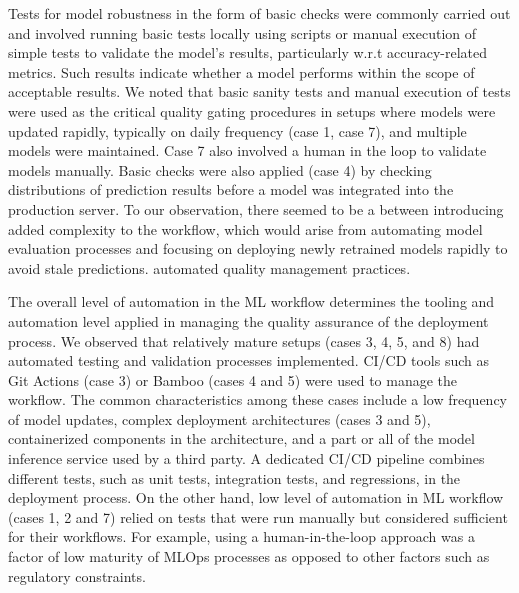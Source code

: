 Tests for model robustness in the form of basic checks were commonly carried out and involved running basic tests locally using scripts or manual execution of simple tests to validate the model's results, particularly w.r.t accuracy-related metrics. Such results indicate whether a model performs within the scope of acceptable results. We noted that basic sanity tests and manual execution of tests were used as the critical quality gating procedures in setups where models were updated rapidly, typically on daily frequency (case 1, case 7), and multiple models were maintained. Case 7 also involved a human in the loop to validate models manually. Basic checks were also applied (case 4) by checking distributions of prediction results before a model was integrated into the production server. To our observation, there seemed to be a \DIFdelbegin {}\DIFdelend \DIFaddbegin {}\DIFaddend between introducing added complexity to the workflow, which would arise from automating model evaluation processes and focusing on deploying newly retrained models rapidly to avoid stale predictions. \DIFdelbegin {}\DIFdelend \DIFaddbegin {}\DIFaddend automated quality management practices\DIFdelbegin {}\DIFdelend \DIFaddbegin {}\DIFaddend . %

The overall level of automation in the ML workflow determines the tooling and automation level applied in managing the quality assurance of the deployment process. We observed that relatively mature setups (cases 3, 4, 5, and 8) had automated testing and validation processes implemented. CI/CD tools such as Git Actions (case 3) or Bamboo (cases 4 and 5) were used to manage the workflow. The common characteristics among these cases include a low frequency of model updates, complex deployment architectures (cases 3 and 5), containerized components in the architecture, and a part or all of the model inference service used by a third party. A dedicated CI/CD pipeline combines different tests, such as unit tests, integration tests, and regressions, in the deployment process. On the other hand, low level of automation in ML workflow %
(cases 1, 2 and 7) relied on tests that were run manually but considered sufficient for their workflows. For example, using a human-in-the-loop approach was a factor of low maturity of MLOps processes as opposed to other factors such as regulatory constraints.


